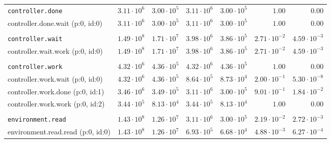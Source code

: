 \begin{table}[htbp]
{\begin{tabular}{lrrrrrr}
\\[-8pt]\texttt{controller.done}              & $3.11 \cdot 10^{6}$ & $3.00 \cdot 10^{5}$ & $3.11 \cdot 10^{6}$ & $3.00 \cdot 10^{5}$ &               $1.00$ &               $0.00$ \\
\hspace{3mm}controller.done.wait (p:0, id:0)  & $3.11 \cdot 10^{6}$ & $3.00 \cdot 10^{5}$ & $3.11 \cdot 10^{6}$ & $3.00 \cdot 10^{5}$ &               $1.00$ &               $0.00$ \\
\\[-8pt]\texttt{controller.wait}              & $1.49 \cdot 10^{8}$ & $1.71 \cdot 10^{7}$ & $3.98 \cdot 10^{6}$ & $3.86 \cdot 10^{5}$ & $2.71 \cdot 10^{-2}$ & $4.59 \cdot 10^{-3}$ \\
\hspace{3mm}controller.wait.work (p:0, id:0)  & $1.49 \cdot 10^{8}$ & $1.71 \cdot 10^{7}$ & $3.98 \cdot 10^{6}$ & $3.86 \cdot 10^{5}$ & $2.71 \cdot 10^{-2}$ & $4.59 \cdot 10^{-3}$ \\
\\[-8pt]\texttt{controller.work}              & $4.32 \cdot 10^{6}$ & $4.36 \cdot 10^{5}$ & $4.32 \cdot 10^{6}$ & $4.36 \cdot 10^{5}$ &               $1.00$ &               $0.00$ \\
\hspace{3mm}controller.work.wait (p:0, id:0)  & $4.32 \cdot 10^{6}$ & $4.36 \cdot 10^{5}$ & $8.64 \cdot 10^{5}$ & $8.73 \cdot 10^{4}$ & $2.00 \cdot 10^{-1}$ & $5.30 \cdot 10^{-8}$ \\
\hspace{3mm}controller.work.done (p:0, id:1)  & $3.46 \cdot 10^{6}$ & $3.49 \cdot 10^{5}$ & $3.11 \cdot 10^{6}$ & $3.00 \cdot 10^{5}$ & $9.01 \cdot 10^{-1}$ & $1.84 \cdot 10^{-2}$ \\
\hspace{3mm}controller.work.work (p:0, id:2)  & $3.44 \cdot 10^{5}$ & $8.13 \cdot 10^{4}$ & $3.44 \cdot 10^{5}$ & $8.13 \cdot 10^{4}$ &               $1.00$ &               $0.00$ \\
\\[-8pt]\texttt{environment.read}             & $1.43 \cdot 10^{8}$ & $1.26 \cdot 10^{7}$ & $3.11 \cdot 10^{6}$ & $3.00 \cdot 10^{5}$ & $2.19 \cdot 10^{-2}$ & $2.72 \cdot 10^{-3}$ \\
\hspace{3mm}environment.read.read (p:0, id:0) & $1.43 \cdot 10^{8}$ & $1.26 \cdot 10^{7}$ & $6.93 \cdot 10^{5}$ & $6.68 \cdot 10^{4}$ & $4.88 \cdot 10^{-3}$ & $6.27 \cdot 10^{-4}$ \\

\end{tabular}}
\end{table}
